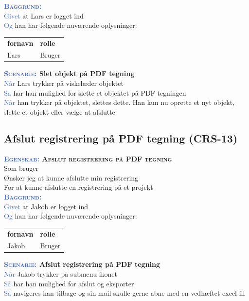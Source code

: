 \textsc{\textcolor{RoyalBlue}{\textbf{Baggrund:}}}\\
\textcolor{RoyalBlue}{Givet} at Lars er logget ind\\
\textcolor{RoyalBlue}{Og} han har følgende nuværende oplysninger:\\
\begin{tabular}{| l | l |}
	\textbf{fornavn} & \textbf{rolle} \\
	Lars & Bruger\\
\end{tabular}

\textbf{\textsc{\textcolor{RoyalBlue}{Scenarie:}} Slet objekt på PDF tegning}\\
\textcolor{RoyalBlue}{Når} Lars trykker på viskelæder objektet\\
\textcolor{RoyalBlue}{Så}  har han mulighed for slette et objektet på PDF tegningen\\
\textcolor{RoyalBlue}{Når} han trykker på objektet, slettes dette. Han kun nu oprette et nyt objekt, slette et objekt eller vælge at afslutte \\

\clearpage

\subsection{Afslut registrering på PDF tegning (CRS-13)} \label{sec:USAfslutRegPåPDF}
\textbf{\textsc{\textcolor{RoyalBlue}{Egenskab:} Afslut registrering på PDF tegning}}\\
Som bruger\\
Ønsker jeg at kunne afslutte min registrering\\
For at kunne afslutte en registrering på et projekt\\

\textsc{\textcolor{RoyalBlue}{\textbf{Baggrund:}}}\\
\textcolor{RoyalBlue}{Givet} at Jakob er logget ind\\
\textcolor{RoyalBlue}{Og} han har følgende nuværende oplysninger:\\
\begin{tabular}{| l | l |}
	\textbf{fornavn} & \textbf{rolle} \\
	Jakob & Bruger\\
\end{tabular}
\newline

\textbf{\textsc{\textcolor{RoyalBlue}{Scenarie:}} Afslut registrering på PDF tegning}\\
\textcolor{RoyalBlue}{Når} Jakob trykker på submenu ikonet\\
\textcolor{RoyalBlue}{Så}  har han mulighed for afslut og eksporter\\
\textcolor{RoyalBlue}{Så}  navigeres han tilbage og sin mail skulle gerne åbne med en vedhæftet excel fil\\


